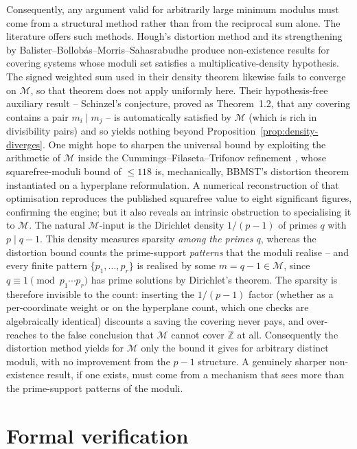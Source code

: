 \documentclass[11pt,a4paper]{article}
\theoremstyle{plain}
\theoremstyle{definition}
\theoremstyle{remark}
\begin{document}
Consequently, any argument valid for arbitrarily large minimum
modulus must come from a structural method rather than from the
reciprocal sum alone. The literature offers such methods. Hough's
distortion method \cite{Hough2015} and its strengthening by
Balister--Bollobás--Morris--Sahasrabudhe \cite{BBMS2022} produce
non-existence results for covering systems whose moduli set
satisfies a multiplicative-density hypothesis. The signed weighted
sum used in their density theorem likewise fails to converge on
$\mathcal{M}$, so that theorem does not apply uniformly here. Their
hypothesis-free auxiliary result -- Schinzel's conjecture, proved as
\cite{BBMS2022} Theorem~1.2, that any covering contains a pair $m_i
\mid m_j$ -- is automatically satisfied by $\mathcal{M}$ (which is
rich in divisibility pairs) and so yields nothing beyond
Proposition~\ref{prop:density-diverges}. One might hope to sharpen the
universal bound by exploiting the arithmetic of $\mathcal{M}$ inside
the Cummings--Filaseta--Trifonov refinement
\cite{CummingsFilasetaTrifonov2022}, whose squarefree-moduli bound of
$\leq 118$ is, mechanically, BBMST's distortion theorem instantiated
on a hyperplane reformulation. A numerical reconstruction of that
optimisation reproduces the published squarefree value to eight
significant figures, confirming the engine; but it also reveals an
intrinsic obstruction to specialising it to $\mathcal{M}$. The natural
$\mathcal{M}$-input is the Dirichlet density $1/(p-1)$ of primes $q$
with $p \mid q - 1$. This density measures sparsity \emph{among the
primes $q$}, whereas the distortion bound counts the
prime-support \emph{patterns} that the moduli realise -- and every
finite pattern $\{p_1, \dots, p_r\}$ is realised by some
$m = q - 1 \in \mathcal{M}$, since $q \equiv 1 \pmod{p_1 \cdots p_r}$
has prime solutions by Dirichlet's theorem. The sparsity is therefore
invisible to the count: inserting the $1/(p-1)$ factor (whether as a
per-coordinate weight or on the hyperplane count, which one checks are
algebraically identical) discounts a saving the covering never pays,
and over-reaches to the false conclusion that $\mathcal{M}$ cannot
cover $\mathbb{Z}$ at all. Consequently the distortion method yields
for $\mathcal{M}$ only the bound it gives for arbitrary distinct
moduli, with no improvement from the $p - 1$ structure. A genuinely
sharper non-existence result, if one exists, must come from a
mechanism that sees more than the prime-support patterns of the
moduli.

\appendix

\section{Formal verification}
\label{sec:formal}
\end{document}
